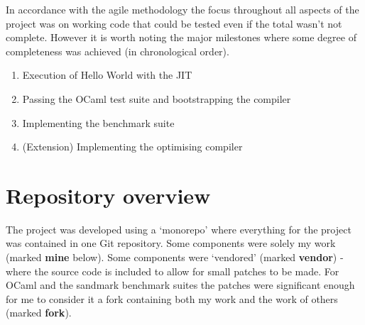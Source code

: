 In accordance with the agile methodology the focus throughout all aspects of the project was on
working code that could be tested even if the total wasn't not complete. However it is worth noting
the major milestones where some degree of completeness was achieved (in chronological order).

\begin{enumerate}
      \item Execution of Hello World with the JIT
      \item Passing the OCaml test suite and bootstrapping the compiler
      \item Implementing the benchmark suite
      \item (Extension) Implementing the optimising compiler
\end{enumerate}

\section{Repository overview}

The project was developed using a `monorepo' where everything for the project was contained in one
Git repository. Some components were solely my work (marked \textbf{mine} below). Some components
were `vendored' (marked \textbf{vendor}) - where the source code is included to allow for small
patches to be made. For OCaml and the sandmark benchmark suites the patches were significant enough
for me to consider it a fork containing both my work and the work of others (marked \textbf{fork}).


